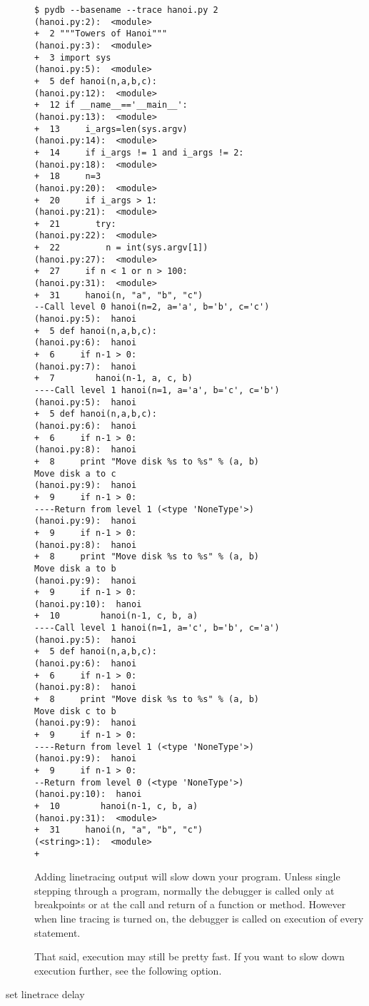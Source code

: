 \begin{description}
\begin{verbatim}
$ pydb --basename --trace hanoi.py 2
(hanoi.py:2):  <module>
+  2 """Towers of Hanoi"""
(hanoi.py:3):  <module>
+  3 import sys
(hanoi.py:5):  <module>
+  5 def hanoi(n,a,b,c):
(hanoi.py:12):  <module>
+  12 if __name__=='__main__':
(hanoi.py:13):  <module>
+  13     i_args=len(sys.argv)
(hanoi.py:14):  <module>
+  14     if i_args != 1 and i_args != 2:
(hanoi.py:18):  <module>
+  18     n=3
(hanoi.py:20):  <module>
+  20     if i_args > 1:
(hanoi.py:21):  <module>
+  21       try: 
(hanoi.py:22):  <module>
+  22         n = int(sys.argv[1])
(hanoi.py:27):  <module>
+  27     if n < 1 or n > 100: 
(hanoi.py:31):  <module>
+  31     hanoi(n, "a", "b", "c")
--Call level 0 hanoi(n=2, a='a', b='b', c='c')
(hanoi.py:5):  hanoi
+  5 def hanoi(n,a,b,c):
(hanoi.py:6):  hanoi
+  6     if n-1 > 0:
(hanoi.py:7):  hanoi
+  7        hanoi(n-1, a, c, b) 
----Call level 1 hanoi(n=1, a='a', b='c', c='b')
(hanoi.py:5):  hanoi
+  5 def hanoi(n,a,b,c):
(hanoi.py:6):  hanoi
+  6     if n-1 > 0:
(hanoi.py:8):  hanoi
+  8     print "Move disk %s to %s" % (a, b)
Move disk a to c
(hanoi.py:9):  hanoi
+  9     if n-1 > 0:
----Return from level 1 (<type 'NoneType'>)
(hanoi.py:9):  hanoi
+  9     if n-1 > 0:
(hanoi.py:8):  hanoi
+  8     print "Move disk %s to %s" % (a, b)
Move disk a to b
(hanoi.py:9):  hanoi
+  9     if n-1 > 0:
(hanoi.py:10):  hanoi
+  10        hanoi(n-1, c, b, a) 
----Call level 1 hanoi(n=1, a='c', b='b', c='a')
(hanoi.py:5):  hanoi
+  5 def hanoi(n,a,b,c):
(hanoi.py:6):  hanoi
+  6     if n-1 > 0:
(hanoi.py:8):  hanoi
+  8     print "Move disk %s to %s" % (a, b)
Move disk c to b
(hanoi.py:9):  hanoi
+  9     if n-1 > 0:
----Return from level 1 (<type 'NoneType'>)
(hanoi.py:9):  hanoi
+  9     if n-1 > 0:
--Return from level 0 (<type 'NoneType'>)
(hanoi.py:10):  hanoi
+  10        hanoi(n-1, c, b, a) 
(hanoi.py:31):  <module>
+  31     hanoi(n, "a", "b", "c")
(<string>:1):  <module>
+ 
\end{verbatim}

Adding linetracing output will slow down your
program. Unless single stepping through a program, normally the
debugger is called only at breakpoints or at the call and return of a
function or method. However when line tracing is turned on, the
debugger is called on execution of every statement. 

That said, execution may still be pretty fast. If you want to slow
down execution further, see the following option.

\item[set linetrace delay \var{time}]\label{command:linetrace-delay}


\end{description}
